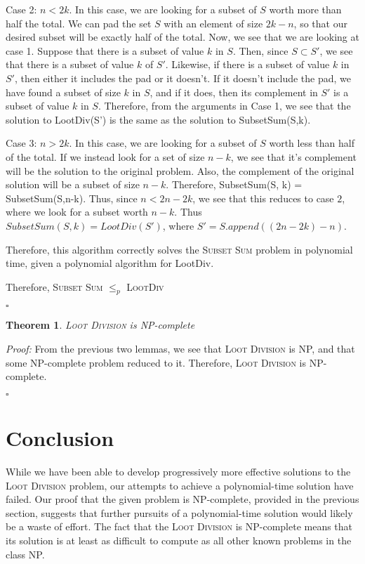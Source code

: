 \documentclass{article}
\newtheorem{theorem}{Theorem}[section]
\begin{document}
Case 2: $n < 2k$.  In this case, we are looking for a subset of $S$ worth more than half the total.  We can pad the set $S$ with an element of size $2k - n$, so that our desired subset will be exactly half of the total.  Now, we see that we are looking at case 1.  Suppose that there is a subset of value $k$ in $S$.  Then, since $S \subset S'$, we see that there is a subset of value $k$ of $S'$.  Likewise, if there is a subset of value $k$ in $S'$, then either it includes the pad or it doesn't.  If it doesn't include the pad, we have found a subset of size $k$ in $S$, and if it does, then its complement in $S'$ is a subset of value $k$ in $S$.  Therefore, from the arguments in Case 1, we see that the solution to LootDiv(S') is the same as the solution to SubsetSum(S,k).

Case 3: $n > 2k$.  In this case, we are looking for a subset of $S$ worth less than half of the total.  If we instead look for a set of size $n - k$, we see that it's complement will be the solution to the original problem.  Also, the complement of the original solution will be a subset of size $n-k$.  Therefore, SubsetSum(S, k) = SubsetSum(S,n-k).  Thus, since $n < 2n - 2k$, we see that this reduces to case $2$, where we look for a subset worth $n-k$.  Thus $SubsetSum(S, k) = LootDiv(S')$, where $S' = S.append((2n - 2k) - n)$.

Therefore, this algorithm correctly solves the \textsc{Subset Sum} problem in polynomial time, given a polynomial algorithm for LootDiv.  

Therefore, \textsc{Subset Sum} $\leq_p$  \textsc{LootDiv} 

\begin{flushright}
$\square$
\end{flushright}

\begin{theorem}
\textsc{Loot Division} is NP-complete
\end{theorem}

\textit{Proof:}  From the previous two lemmas, we see that \textsc{Loot Division} is NP, and that some NP-complete problem reduced to it.  Therefore, \textsc{Loot Division} is NP-complete.

\begin{flushright}
$\square$
\end{flushright}

\section{Conclusion}

While we have been able to develop progressively more effective solutions to the \textsc{Loot Division} problem, our attempts to achieve a polynomial-time solution have failed. Our proof that the given problem is NP-complete, provided in the previous section, suggests that further pursuits of a polynomial-time solution would likely be a waste of effort. The fact that the \textsc{Loot Division} is NP-complete means that its solution is at least as difficult to compute as all other known problems in the class NP.
\end{document}
